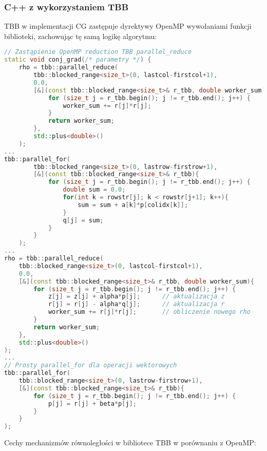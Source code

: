 \subsubsection{C++ z wykorzystaniem TBB}
TBB w implementacji CG zastępuje dyrektywy OpenMP wywołaniami funkcji biblioteki, zachowując tę samą logikę algorytmu:
\begin{lstlisting}[language=C++, caption={Równoległość w C++ z TBB}, label={lst:cg_tbb_parallelism}]
// Zastąpienie OpenMP reduction TBB parallel_reduce
static void conj_grad(/* parametry */) {
    rho = tbb::parallel_reduce(
        tbb::blocked_range<size_t>(0, lastcol-firstcol+1), 
        0.0, 
        [&](const tbb::blocked_range<size_t>& r_tbb, double worker_sum){
            for (size_t j = r_tbb.begin(); j != r_tbb.end(); j++) {
                worker_sum += r[j]*r[j];
            }
            return worker_sum;
        }, 
        std::plus<double>()
    );
...
tbb::parallel_for(
        tbb::blocked_range<size_t>(0, lastrow-firstrow+1), 
        [&](const tbb::blocked_range<size_t>& r_tbb){
            for (size_t j = r_tbb.begin(); j != r_tbb.end(); j++) {
                double sum = 0.0;
                for(int k = rowstr[j]; k < rowstr[j+1]; k++){
                    sum = sum + a[k]*p[colidx[k]];
                }
                q[j] = sum;
            }
        }
    );
...
rho = tbb::parallel_reduce(
    tbb::blocked_range<size_t>(0, lastcol-firstcol+1), 
    0.0, 
    [&](const tbb::blocked_range<size_t>& r_tbb, double worker_sum){
        for (size_t j = r_tbb.begin(); j != r_tbb.end(); j++) {
            z[j] = z[j] + alpha*p[j];      // aktualizacja z
            r[j] = r[j] - alpha*q[j];      // aktualizacja r
            worker_sum += r[j]*r[j];       // obliczenie nowego rho
        }
        return worker_sum;
    }, 
    std::plus<double>()
);
...
// Prosty parallel_for dla operacji wektorowych
tbb::parallel_for(
    tbb::blocked_range<size_t>(0, lastrow-firstrow+1), 
    [&](const tbb::blocked_range<size_t>& r_tbb){
        for (size_t j = r_tbb.begin(); j != r_tbb.end(); j++) {
            p[j] = r[j] + beta*p[j];
        }
    }
);

\end{lstlisting}
Cechy mechanizmów równoległości w bibliotece TBB w porównaniu z OpenMP:
